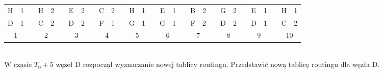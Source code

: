 \begin{tabular}{|c|c|c|c|c|c|c|c|c|c|c|c|c|c|c|c|c|c|c|c|c|c|c|c|c|c|c|c|c|}
				H          & 1          &  & H           & 2         &  & E          & 2         &  & C           & 2         &  & H           & 1         &  & E           & 1         &  & B           & 2         &  & G           & 2         &  & E           & 1         &  & H          & 1         \\ \cline{1-2} \cline{4-5} \cline{7-8} \cline{10-11} \cline{13-14} \cline{16-17} \cline{19-20} \cline{22-23} \cline{25-26} \cline{28-29} 
				D          & 1          &  & C           & 2         &  & D          & 2         &  & F           & 1         &  & G           & 1         &  & G           & 1         &  & F           & 2         &  & D           & 2         &  & D           & 1         &  & C          & 2         \\ \cline{1-2} \cline{4-5} \cline{7-8} \cline{10-11} \cline{13-14} \cline{16-17} \cline{19-20} \cline{22-23} \cline{25-26} \cline{28-29}
				\multicolumn{2}{c}{1} &  & \multicolumn{2}{c}{2} &  & \multicolumn{2}{c}{3} &  & \multicolumn{2}{c}{4} &  & \multicolumn{2}{c}{5} &  & \multicolumn{2}{c}{6} &  & \multicolumn{2}{c}{7} &  & \multicolumn{2}{c}{8} &  & \multicolumn{2}{c}{9} &  & \multicolumn{2}{c}{10} \\ 
			\end{tabular}\\
			W czasie $ T_0+5 $ węzeł D rozpoczął wyznaczanie nowej tablicy routingu. Przedstawić nową tablicę routingu dla węzła D.
\newpage
